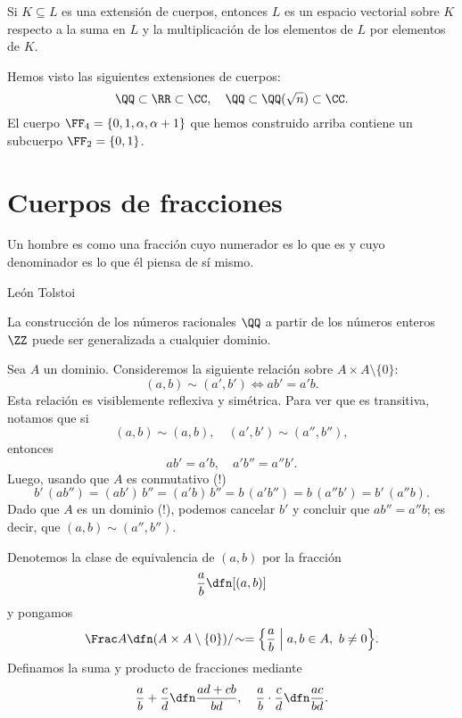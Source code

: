 \begin{observacionejerc}
  Si $K \subseteq L$ es una extensión de cuerpos, entonces $L$ es un espacio
  vectorial sobre $K$ respecto a la suma en $L$ y la multiplicación de los
  elementos de $L$ por elementos de $K$.
\end{observacionejerc}

\begin{ejemplo}
  Hemos visto las siguientes extensiones de cuerpos:
  $$\QQ \subset \RR \subset \CC, \quad \QQ \subset \QQ (\sqrt{n}) \subset \CC.$$
  El cuerpo $\FF_4 = \{ 0, 1, \alpha, \alpha+1 \}$ que hemos construido arriba
  contiene un subcuerpo $\FF_2 = \{ 0, 1 \}$.
\end{ejemplo}


\section{Cuerpos de fracciones}

\epigraph{Un hombre es como una fracción cuyo numerador es lo que es y cuyo
  denominador es lo que él piensa de sí mismo.}{León Tolstoi}

La construcción de los números racionales $\QQ$ a partir de los números enteros
$\ZZ$ puede ser generalizada a cualquier dominio.

\begin{construccion}
  Sea $A$ un dominio. Consideremos la siguiente relación sobre
  $A\times A\setminus \{ 0 \}$:
  $$(a,b) \sim (a',b') \iff ab' = a'b.$$
  Esta relación es visiblemente reflexiva y simétrica. Para ver que es
  transitiva, notamos que si
  $$(a,b) \sim (a,b), \quad (a',b') \sim (a'',b''),$$
  entonces
  $$ab' = a'b, \quad a'b'' = a''b'.$$
  Luego, usando que $A$ es conmutativo (!)
  $$b' \, (ab'') = (ab')\,b'' = (a'b)\,b'' = b\,(a'b'') = b\,(a'' b') = b'\,(a''b).$$
  Dado que $A$ es un dominio (!), podemos cancelar $b'$ y concluir que
  $ab'' = a''b$; es decir, que $(a,b) \sim (a'',b'')$.

  Denotemos la clase de equivalencia de $(a,b)$ por la fracción
  $$\frac{a}{b} \dfn [(a,b)]$$
  y pongamos
  $$\Frac A \dfn (A\times A\setminus \{ 0 \})/\!\sim = \Bigl\{ \frac{a}{b} \Bigm| a,b\in A, ~ b\ne 0 \Bigr\}.$$
  Definamos la suma y producto de fracciones mediante
  \[ \frac{a}{b} + \frac{c}{d} \dfn \frac{ad + cb}{bd}, \quad
    \frac{a}{b}\cdot\frac{c}{d} \dfn \frac{ac}{bd}. \]
\end{construccion}

